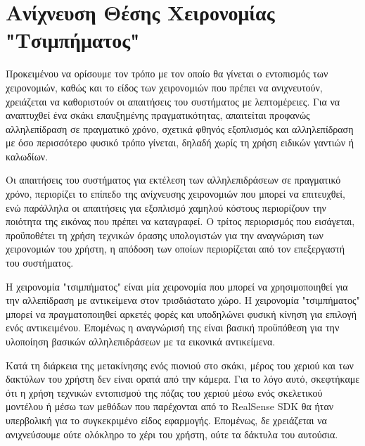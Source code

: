 \section{Ανίχνευση Θέσης Χειρονομίας "Τσιμπήματος"} \label{section:pinch}




Προκειμένου να ορίσουμε τον τρόπο με τον οποίο θα γίνεται ο εντοπισμός των χειρονομιών, καθώς και το είδος των χειρονομιών που πρέπει να ανιχνευτούν, χρειάζεται να καθοριστούν οι απαιτήσεις του συστήματος με λεπτομέρειες.
Για να αναπτυχθεί ένα σκάκι επαυξημένης πραγματικότητας, απαιτείται προφανώς αλληλεπίδραση σε πραγματικό χρόνο, σχετικά φθηνός εξοπλισμός και αλληλεπίδραση με όσο περισσότερο φυσικό τρόπο γίνεται, δηλαδή χωρίς τη χρήση ειδικών γαντιών ή καλωδίων. 

Οι απαιτήσεις του συστήματος για εκτέλεση των αλληλεπιδράσεων σε πραγματικό χρόνο, περιορίζει το επίπεδο της ανίχνευσης χειρονομιών που μπορεί να επιτευχθεί, ενώ παράλληλα οι απαιτήσεις για εξοπλισμό χαμηλού κόστους περιορίζουν την ποιότητα της εικόνας που πρέπει να καταγραφεί. Ο τρίτος περιορισμός που εισάγεται, προϋποθέτει τη χρήση τεχνικών όρασης υπολογιστών για την αναγνώριση των χειρονομιών του χρήστη, η απόδοση των οποίων περιορίζεται από τον επεξεργαστή του συστήματος. 



Η χειρονομία "τσιμπήματος" είναι μία χειρονομία που μπορεί να χρησιμοποιηθεί για την αλλεπίδραση με αντικείμενα στον τρισδιάστατο χώρο. Η χειρονομία "τσιμπήματος" μπορεί να πραγματοποιηθεί αρκετές φορές και υποδηλώνει φυσική κίνηση για επιλογή ενός αντικειμένου. Επομένως η αναγνώρισή της είναι βασική προϋπόθεση για την υλοποίηση βασικών αλληλεπιδράσεων με τα εικονικά αντικείμενα. 


Κατά τη διάρκεια της μετακίνησης ενός πιονιού στο σκάκι, μέρος του χεριού και των δακτύλων του χρήστη δεν είναι ορατά από την κάμερα. Για το λόγο αυτό, σκεφτήκαμε ότι η χρήση τεχνικών εντοπισμού της πόζας του χεριού μέσω ενός σκελετικού μοντέλου ή μέσω των μεθόδων που παρέχονται από το RealSense\texttrademark{} SDK θα ήταν υπερβολική για το συγκεκριμένο είδος εφαρμογής. Επομένως, δε χρειάζεται να ανιχνεύσουμε ούτε ολόκληρο το χέρι του χρήστη, ούτε τα δάκτυλα του αυτούσια. 



